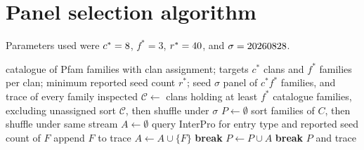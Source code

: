\documentclass[11pt,a4paper]{article}
\begin{document}
\clearpage
\appendix

\section{Panel selection algorithm}
\label{app:panel}

Parameters used were \(c^\ast=8\), \(f^\ast=3\),
\(r^\ast=40\), and \(\sigma=20260828\).

\begin{algorithm}[htbp]
\caption{Seeded selection of clan and family panel}
\label{alg:panel}
\begin{algorithmic}[1]
  \Require catalogue of Pfam families with clan assignment; targets \(c^\ast\) clans and \(f^\ast\) families per clan; minimum reported seed count \(r^\ast\); seed \(\sigma\)
  \Ensure panel of \(c^\ast f^\ast\) families, and trace of every family inspected
  \State \(\mathcal C\gets\) clans holding at least \(f^\ast\) catalogue families, excluding unassigned
  \State sort \(\mathcal C\), then shuffle under \(\sigma\)
  \State \(P\gets\emptyset\)
    \State sort families of \(C\), then shuffle under same stream
    \State \(A\gets\emptyset\)
      \State query InterPro for entry type and reported seed count of \(F\)
      \State append \(F\) to trace
        \State \(A\gets A\cup\{F\}\)
      \EndIf
       \State \textbf{break} \EndIf
    \EndFor
      \State \(P\gets P\cup A\) 
       \State \textbf{break} \EndIf
    \EndIf
  \EndFor
  \State \Return \(P\) and trace
\end{algorithmic}
\end{algorithm}

\footnotesize
\setlength{\bibsep}{1pt}


\end{document}
